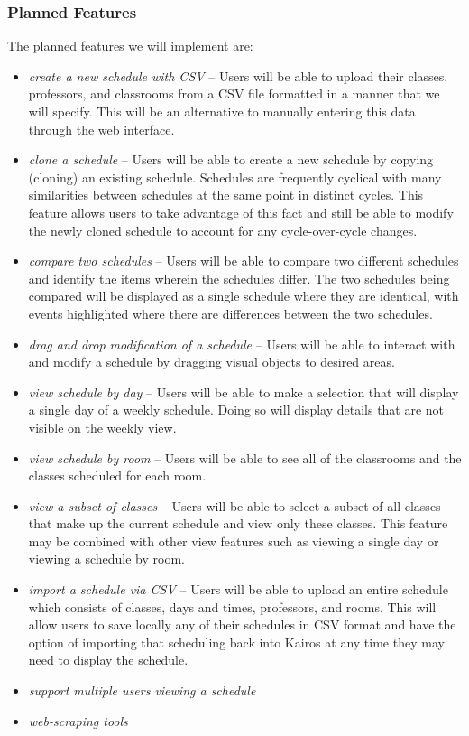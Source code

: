 \documentclass{extarticle}
\begin{document}
\subsubsection{Planned Features}
The planned features we will implement are:
\begin{itemize}
\item \emph{create a new schedule with CSV} -- Users will be able to upload their classes, professors, and
classrooms from a CSV file formatted in a manner that we will specify. This will be an alternative to manually
entering this data through the web interface.
\item \emph{clone a schedule} -- Users will be able to create a new schedule by copying (cloning) an existing
schedule.  Schedules are frequently cyclical with many similarities between schedules at the same point in distinct
cycles.  This feature allows users to take advantage of this fact and still be able to modify the newly cloned
schedule to account for any cycle-over-cycle changes.
\item \emph{compare two schedules} -- Users will be able to compare two different schedules and identify the items
wherein the schedules differ.  The two schedules being compared will be displayed as a single schedule where they
are identical, with events highlighted where there are differences between the two schedules.
\item \emph{drag and drop modification of a schedule} -- Users will be able to interact with and modify a schedule by
dragging visual objects to desired areas.
\item \emph{view schedule by day} -- Users will be able to make a selection that will display a single day of a
weekly schedule.  Doing so will display details that are not visible on the weekly view.
\item \emph{view schedule by room} -- Users will be able to see all of the classrooms and the classes scheduled for
each room.
\item \emph{view a subset of classes} -- Users will be able to select a subset of all classes that make up the
current schedule and view only these classes.  This feature may be combined with other view features such as viewing
a single day or viewing a schedule by room.
\item \emph{import a schedule via CSV} -- Users will be able to upload an entire schedule which consists of classes,
days and times, professors, and rooms. This will allow users to save locally any of their schedules in CSV format
and have the option of importing that scheduling back into Kairos at any time they may need to display the schedule.
\item \emph{support multiple users viewing a schedule} %
\item \emph{web-scraping tools} %
\end{itemize}
\end{document}
